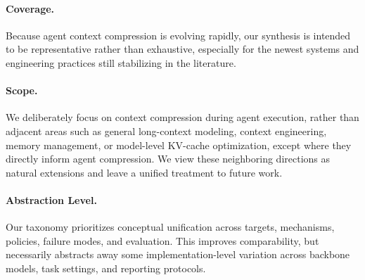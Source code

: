 
\paragraph{Coverage.} Because agent context compression is evolving rapidly, our synthesis is intended to be representative rather than exhaustive, especially for the newest systems and engineering practices still stabilizing in the literature.

\paragraph{Scope.} We deliberately focus on context compression during agent execution, rather than adjacent areas such as general long-context modeling, context engineering, memory management, or model-level KV-cache optimization, except where they directly inform agent compression. We view these neighboring directions as natural extensions and leave a unified treatment to future work.

\paragraph{Abstraction Level.} Our taxonomy prioritizes conceptual unification across targets, mechanisms, policies, failure modes, and evaluation. This improves comparability, but necessarily abstracts away some implementation-level variation across backbone models, task settings, and reporting protocols.

